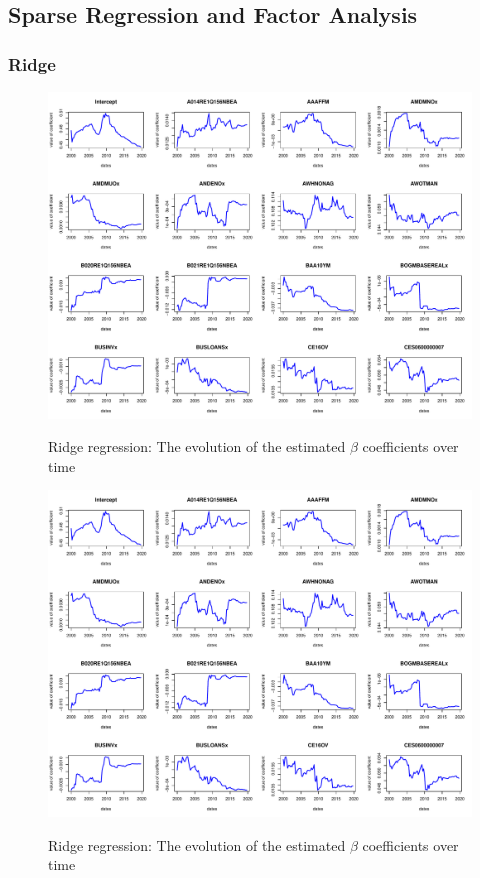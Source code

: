 \documentclass{article}
\begin{document}
\clearpage
\subsection{Sparse Regression and Factor Analysis}

\subsubsection{Ridge}

\begin{subfigures}
\begin{figure}[hbt!]
\includegraphics[page = 1, width=\textwidth]{plots/ridge_betas}
\label{fig:ridge_betas}
\caption{\label{first}Ridge regression: The evolution of the estimated $\beta$ coefficients over time}
\centering
\end{figure}

\begin{figure}[hbt!]
\includegraphics[page = 2, width=\textwidth]{plots/ridge_betas}
\label{fig:ridge_betas}
\caption{\label{second}Ridge regression: The evolution of the estimated $\beta$ coefficients over time}
\centering
\end{figure}


\end{subfigures}
\end{document}
